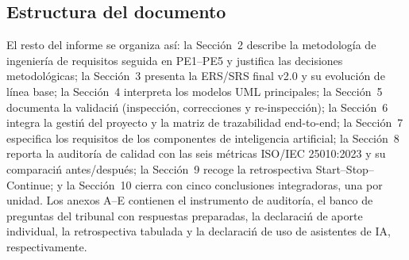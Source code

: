 \subsection{Estructura del documento}

El resto del informe se organiza as\'i: la Secci\'on~2 describe la metodolog\'ia de ingenier\'ia de requisitos seguida en PE1--PE5 y justifica las decisiones metodol\'ogicas; la Secci\'on~3 presenta la ERS/SRS final v2.0 y su evoluci\'on de l\'inea base; la Secci\'on~4 interpreta los modelos UML principales; la Secci\'on~5 documenta la validaci\'n (inspecci\'on, correcciones y re-inspecci\'on); la Secci\'on~6 integra la gesti\'n del proyecto y la matriz de trazabilidad end-to-end; la Secci\'on~7 especifica los requisitos de los componentes de inteligencia artificial; la Secci\'on~8 reporta la auditor\'ia de calidad con las seis m\'etricas ISO/IEC 25010:2023 y su comparaci\'n antes/despu\'es; la Secci\'on~9 recoge la retrospectiva Start--Stop--Continue; y la Secci\'on~10 cierra con cinco conclusiones integradoras, una por unidad. Los anexos A--E contienen el instrumento de auditor\'ia, el banco de preguntas del tribunal con respuestas preparadas, la declaraci\'n de aporte individual, la retrospectiva tabulada y la declaraci\'n de uso de asistentes de IA, respectivamente.
